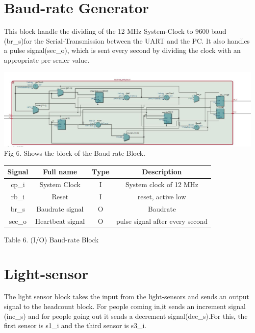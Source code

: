 \documentclass{article}
\begin{document}
\section{Baud-rate Generator}
This block handle the dividing of the 12 MHz System-Clock to 9600 baud (br\_s)for the Serial-Transmission between the UART and the PC. It also handles a pulse signal(sec\_o), which is sent  every second by dividing the clock with an appropriate pre-scaler value.
\begin{center}

\includegraphics[width=15cm]{baudrate.JPG}
    Fig 6. Shows the block of the Baud-rate Block.

\end{center}
    \vspace{2cm}
  \begin{center}
        
          \begin{tabular}{|c|c|c|c|}
         \hline 
        Signal & Full name & Type &Description \\
        \hline
        \hline
        cp\_i & System Clock & I &System clock of 12 MHz \\ 
        \hline
        rb\_i & Reset & I & reset, active low \\
        \hline 
        br\_s & Baudrate signal & O & Baudrate \\
        \hline
        sec\_o & Heartbeat signal & O & pulse signal after every second\\
        \hline
          \end{tabular}
       
     
\end{center}
 Table 6. (I/O) Baud-rate Block
  
  \vspace{2.5cm}
 
  \newpage
\section{Light-sensor}
The light sensor block takes the input from the light-sensors and sends an output signal to the headcount block. For people coming in,it sends an increment signal (inc\_s) and for people going out it sends a decrement signal(dec\_s).For this, the first sensor is s1\_i and the  third sensor is s3\_i.
\end{document}
